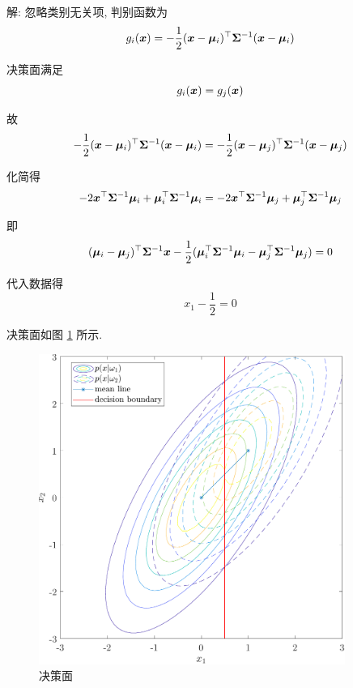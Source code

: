 \documentclass{article}
\begin{document}
解: 忽略类别无关项, 判别函数为
\begin{equation}
  g_i(\bm{x})=-\frac{1}{2}(\bm{x}-\bm{\mu}_i)^{\top}\bm{\Sigma}^{-1}(\bm{x}-\bm{\mu}_i)
\end{equation}

决策面满足
\begin{equation}
  g_i(\bm{x})=g_j(\bm{x})
\end{equation}

故
\begin{equation}
  -\frac{1}{2}(\bm{x}-\bm{\mu}_i)^{\top}\bm{\Sigma}^{-1}(\bm{x}-\bm{\mu}_i)=-\frac{1}{2}(\bm{x}-\bm{\mu}_j)^{\top}\bm{\Sigma}^{-1}(\bm{x}-\bm{\mu}_j)
\end{equation}

化简得
\begin{equation}
  -2\bm{x}^{\top}\bm{\Sigma}^{-1}\bm{\mu}_i+\bm{\mu}_i^{\top}\bm{\Sigma}^{-1}\bm{\mu}_i
  =-2\bm{x}^{\top}\bm{\Sigma}^{-1}\bm{\mu}_j+\bm{\mu}_j^{\top}\bm{\Sigma}^{-1}\bm{\mu}_j
\end{equation}

即
\begin{equation}
  (\bm{\mu}_i-\bm{\mu}_j)^{\top}\bm{\Sigma}^{-1}\bm{x}-\frac{1}{2}(\bm{\mu}_i^{\top}\bm{\Sigma}^{-1}\bm{\mu}_i-\bm{\mu}_j^{\top}\bm{\Sigma}^{-1}\bm{\mu}_j)=0
\end{equation}

代入数据得
\begin{equation}
  x_1-\frac{1}{2}=0
\end{equation}

决策面如图 \ref{fig:mvnpdf-3} 所示.

\begin{figure}
  \centering
  \includegraphics[width=10cm]{mvnpdf-3.pdf}
  \caption{决策面}
  \label{fig:mvnpdf-3}
\end{figure}
\end{document}
